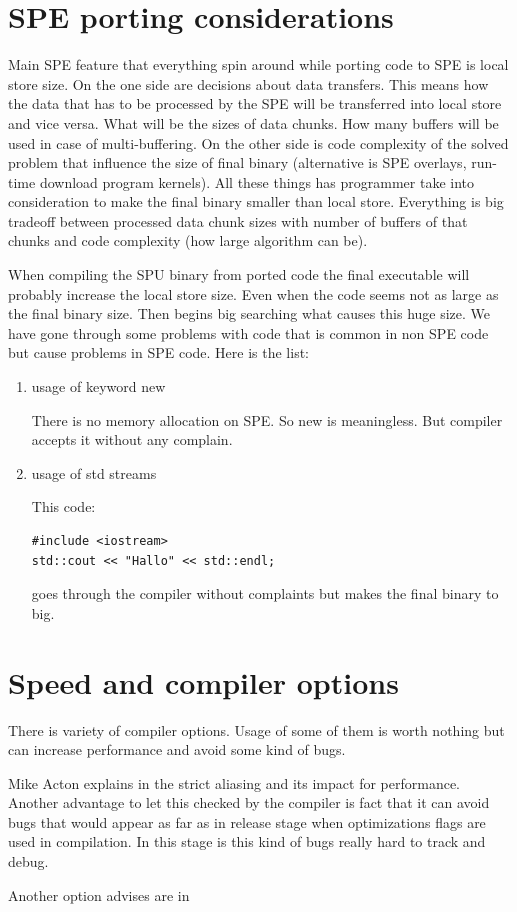 \section {SPE porting considerations}

\par
Main SPE feature that everything spin around while porting code to SPE is local store size.
On the one side are decisions about data transfers.
This means how the data that has to be processed by the SPE will be transferred into local store and vice versa.
What will be the sizes of data chunks.
How many buffers will be used in case of multi-buffering.
On the other side is code complexity of the solved problem that influence the size of final binary (alternative is SPE overlays, run-time download program kernels).
All these things has programmer take into consideration to make the final binary smaller than local store.
Everything is big tradeoff between processed data chunk sizes with number of buffers of that chunks and code complexity (how large algorithm can be).
\par
When compiling the SPU binary from ported code the final executable will probably increase the local store size.
Even when the code seems not as large as the final binary size.
Then begins big searching what causes this huge size.
We have gone through some problems with code that is common in non SPE code but cause problems in SPE code.
Here is the list:
\begin{enumerate}
\item usage of keyword new
\par
There is no memory allocation on SPE. So new is meaningless.
But compiler accepts it without any complain.

\item usage of std streams
\par
This code:
\begin{verbatim}
#include <iostream>
std::cout << "Hallo" << std::endl;
\end{verbatim}
goes through the compiler without complaints but makes the final binary to big.

\end{enumerate}

\section {Speed and compiler options}

\par
There is variety of compiler options.
Usage of some of them is worth nothing but can increase performance and avoid some kind of bugs.

\par
Mike Acton explains in \cite{strictAliasing} the strict aliasing and its impact for performance.
Another advantage to let this checked by the compiler is fact that it can avoid bugs that would appear as far as in release stage when optimizations flags are used in compilation.
In this stage is this kind of bugs really hard to track and debug.

\par
Another option advises are in \cite{compilerOptions}